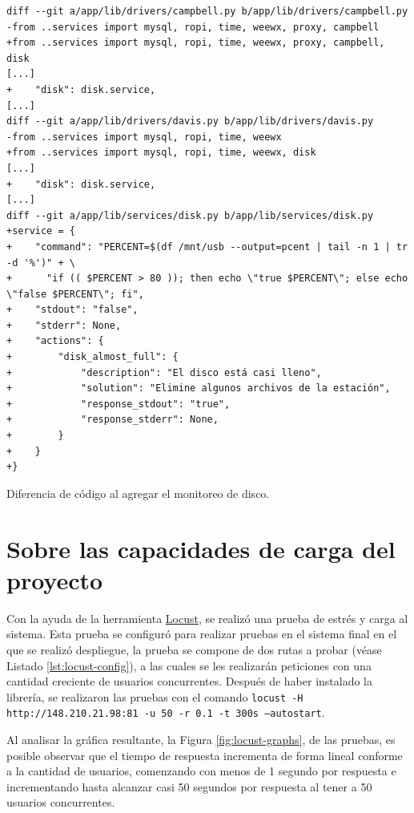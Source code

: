\begin{listing}
\begin{verbatim}
diff --git a/app/lib/drivers/campbell.py b/app/lib/drivers/campbell.py
-from ..services import mysql, ropi, time, weewx, proxy, campbell
+from ..services import mysql, ropi, time, weewx, proxy, campbell, disk
[...]
+    "disk": disk.service,
[...]
diff --git a/app/lib/drivers/davis.py b/app/lib/drivers/davis.py
-from ..services import mysql, ropi, time, weewx
+from ..services import mysql, ropi, time, weewx, disk
[...]
+    "disk": disk.service,
[...]
diff --git a/app/lib/services/disk.py b/app/lib/services/disk.py
+service = {
+    "command": "PERCENT=$(df /mnt/usb --output=pcent | tail -n 1 | tr -d '%')" + \
+      "if (( $PERCENT > 80 )); then echo \"true $PERCENT\"; else echo \"false $PERCENT\"; fi",
+    "stdout": "false",
+    "stderr": None,
+    "actions": {
+        "disk_almost_full": {
+            "description": "El disco está casi lleno",
+            "solution": "Elimine algunos archivos de la estación",
+            "response_stdout": "true",
+            "response_stderr": None,
+        }
+    }
+}
\end{verbatim}
\caption{Diferencia de código al agregar el monitoreo de disco.}
\label{lst:git-diff-disk}
\end{listing}

\section{Sobre las capacidades de carga del proyecto}

Con la ayuda de la herramienta \href{https://locust.io/}{Locust}, se realizó una prueba de estrés y carga al sistema. Esta prueba se configuró para realizar pruebas en el sistema final en el que se realizó despliegue, la prueba se compone de dos rutas a probar (véase Listado \ref{lst:locust-config}), a las cuales se les realizarán peticiones con una cantidad creciente de usuarios concurrentes. Después de haber instalado la librería, se realizaron las pruebas con el comando \texttt{locust -H http://148.210.21.98:81 -u 50 -r 0.1 -t 300s --autostart}.

Al analisar la gráfica resultante, la Figura \ref{fig:locust-graphs}, de las pruebas, es posible observar que el tiempo de respuesta incrementa de forma lineal conforme a la cantidad de usuarios, comenzando con menos de 1 segundo por respuesta e incrementando hasta alcanzar casi 50 segundos por respuesta al tener a 50 usuarios concurrentes.

